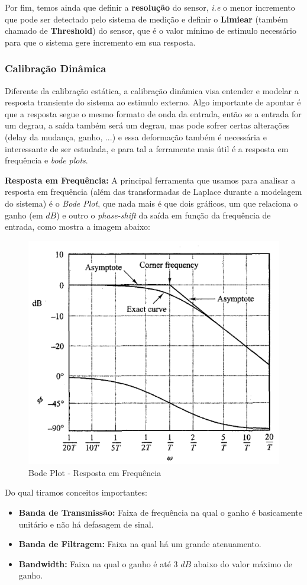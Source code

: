 \documentclass{article}
\begin{document}
                Por fim, temos ainda que definir a \textbf{resolução} do sensor, \emph{i.e} o menor incremento que pode ser detectado pelo sistema de medição e definir o \textbf{Limiear} (também
                chamado de \textbf{Threshold}) do sensor, que é o valor mínimo de estimulo necessário para que o sistema gere incremento em sua resposta.

            \subsubsection{Calibração Dinâmica}
                Diferente da calibração estática, a calibração dinâmica visa entender e modelar a resposta transiente do sistema ao estimulo externo. Algo importante de apontar é que a resposta segue
                o mesmo formato de onda da entrada, então se a entrada for um degrau, a saída também será um degrau, mas pode sofrer certas alterações (delay da mudança, ganho, ...) e essa deformação
                também é necessária e interessante de ser estudada, e para tal a ferramente mais útil é a resposta em frequência e \emph{bode plots}.

                \textbf{Resposta em Frequência:} A principal ferramenta que usamos para analisar a resposta em frequência (além das transformadas de Laplace durante a modelagem do sistema) é o
                \emph{Bode Plot}, que nada mais é que dois gráficos, um que relaciona o ganho (em $dB$) e outro o \emph{phase-shift} da saída em função da frequência de entrada, como mostra a imagem
                abaixo:
                \begin{figure}[h]
                    \centering
                    \includegraphics[width=.5\textwidth]{imgs/bode_plot.png}
                    \caption{Bode Plot - Resposta em Frequência}
                \end{figure}

                Do qual tiramos conceitos importantes:
                \begin{itemize}
                    \item \textbf{Banda de Transmissão:} Faixa de frequência na qual o ganho é basicamente unitário e não há defasagem de sinal.
                    \item \textbf{Banda de Filtragem:} Faixa na qual há um grande atenuamento.
                    \item \textbf{Bandwidth:} Faixa na qual o ganho é até 3 $dB$ abaixo do valor máximo de ganho.
                \end{itemize}




    
\end{document}
